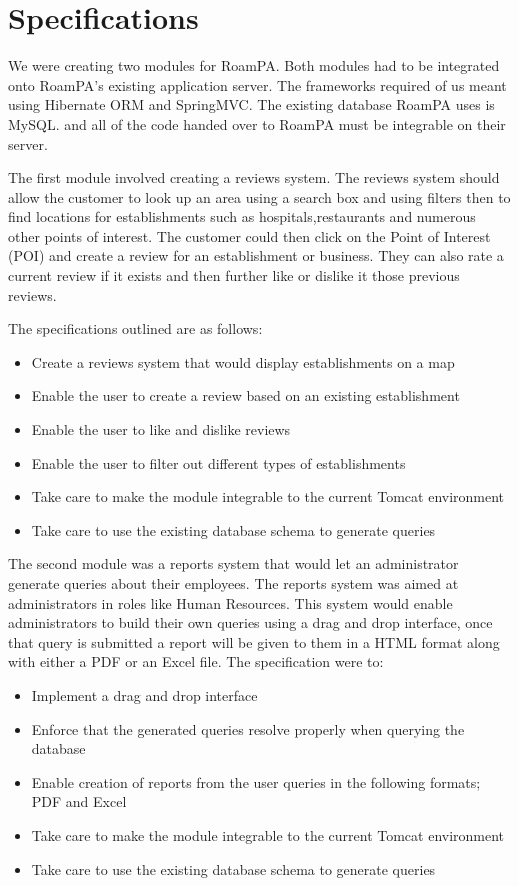 \section{Specifications}

We were creating two modules for RoamPA. Both modules had to be integrated onto RoamPA's existing application server. The frameworks required of us meant using Hibernate ORM and SpringMVC. The existing database RoamPA uses is MySQL. and all of the code handed over to RoamPA must be integrable on their server. \newline

\noindent The first module involved creating a reviews system. The reviews system should allow the customer to look up an area using a search box and using filters then to find locations for establishments such as hospitals,restaurants and numerous other points of interest. The customer could then click on the Point of Interest (POI) and create a review for an establishment or business. They can also rate a current review if it exists and then further like or dislike it those previous reviews.

The specifications outlined are as follows:

\begin{itemize}
	\item Create a reviews system that would display establishments on a map
	\item Enable the user to create a review based on an existing establishment
	\item Enable the user to like and dislike reviews
	\item Enable the user to filter out different types of establishments
	\item Take care to make the module integrable to the current Tomcat environment
	\item Take care to use the existing database schema to generate queries
\end{itemize}

The second module was a reports system that would let an administrator generate queries about their employees. The reports system was aimed at administrators in roles like Human Resources. This system would enable administrators to build their own queries using a drag and drop interface, once that query is submitted a report will be given to them in a HTML format along with either a PDF or an Excel file. The specification were to:

\begin{itemize}
	\item Implement a drag and drop interface 
	\item Enforce that the generated queries resolve properly when querying the database
	\item Enable creation of reports from the user queries in the following formats; PDF and Excel
	\item Take care to make the module integrable to the current Tomcat environment
	\item Take care to use the existing database schema to generate queries
\end{itemize}


